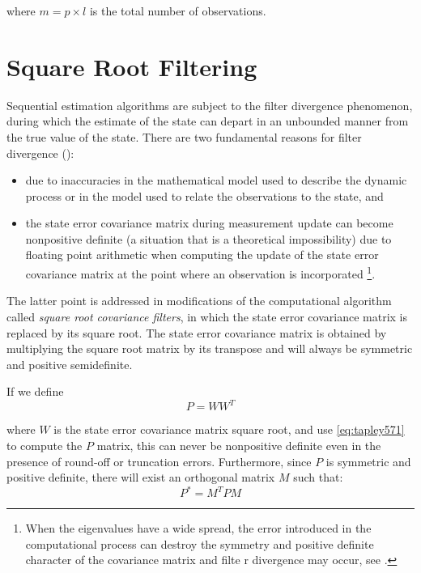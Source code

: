 where \( m = p \times l \) is the total number of observations.

\section{Square Root Filtering}
Sequential estimation algorithms are subject to the filter divergence phenomenon, during 
which the estimate of the state can depart in an unbounded manner from the true value 
of the state. There are two fundamental reasons for filter divergence (\cite{tapley}):
\begin{itemize}
  \item due to inaccuracies in the mathematical model used to describe the dynamic 
  process or in the model used to relate the observations to the state, and
  \item the state error covariance matrix during measurement update can become nonpositive 
  definite (a situation that is a theoretical impossibility) due to floating point 
  arithmetic when computing the update of the state error covariance matrix at the 
  point where an observation is incorporated \footnote{When the eigenvalues have a wide spread, the error
introduced in the computational process can destroy the symmetry and positive
definite character of the covariance matrix and filte r divergence may occur, see \cite{tapley}.}.
\end{itemize}

The latter point is addressed in modifications of the computational algorithm called 
\emph{square root covariance filters}, in which the state error covariance matrix is 
replaced by its square root. The state error covariance matrix is obtained by
multiplying the square root matrix by its transpose and will always be symmetric
and positive semidefinite.

If we define
\begin{equation}
\label{eq:tapley571}
P = W W^T
\end{equation}

where \(W\) is the state error covariance matrix square root, and use \ref{eq:tapley571} to 
compute the \(P\) matrix, this can never be nonpositive definite even in the presence 
of round-off or truncation errors. Furthermore, since \(P\) is symmetric and positive 
definite, there will exist an orthogonal matrix \(M\) such that:
\begin{equation}
\label{eq:tapley572}
  P^* = M^T P M
\end{equation}

